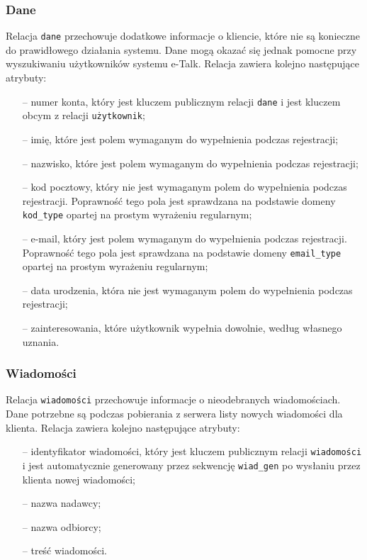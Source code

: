\documentclass[a4paper,12pt]{article}
\begin{document}
\subsubsection[Dane]{Dane}
Relacja \texttt{dane} przechowuje dodatkowe informacje o kliencie, które nie są konieczne do prawidłowego działania systemu. Dane mogą okazać się jednak pomocne przy wyszukiwaniu użytkowników systemu e-Talk. Relacja zawiera kolejno następujące atrybuty:
\begin{itemize}
    \item[--] numer konta, który jest kluczem publicznym relacji \texttt{dane} i jest kluczem obcym z relacji \texttt{użytkownik};
    \item[--] imię, które jest polem wymaganym do wypełnienia podczas rejestracji;    
    \item[--] nazwisko, które jest polem wymaganym do wypełnienia podczas rejestracji;
    \item[--] kod pocztowy, który nie jest wymaganym polem do wypełnienia podczas rejestracji. Poprawność
              tego pola jest sprawdzana na podstawie domeny \texttt{kod\_type} opartej na prostym wyrażeniu
              regularnym;
    \item[--] e-mail, który jest polem wymaganym do wypełnienia podczas rejestracji. Poprawność
              tego pola jest sprawdzana na podstawie domeny \texttt{email\_type} opartej na prostym wyrażeniu
              regularnym;
    \item[--] data urodzenia, która nie jest wymaganym polem do wypełnienia podczas rejestracji;
    \item[--] zainteresowania, które użytkownik wypełnia dowolnie, według własnego uznania.
\end{itemize}

\subsubsection[Wiadomości]{Wiadomości}
Relacja \texttt{wiadomości} przechowuje informacje o nieodebranych wiadomościach. Dane potrzebne są podczas pobierania z serwera listy nowych wiadomości dla klienta. Relacja zawiera kolejno następujące atrybuty:
\begin{itemize}
    \item[--] identyfikator wiadomości, który jest kluczem publicznym relacji \texttt{wiadomości} i jest automatycznie generowany przez sekwencję \texttt{wiad\_gen} po wysłaniu przez klienta nowej wiadomości;
    \item[--] nazwa nadawcy;
    \item[--] nazwa odbiorcy;
    \item[--] treść wiadomości.
\end{itemize}
\end{document}
